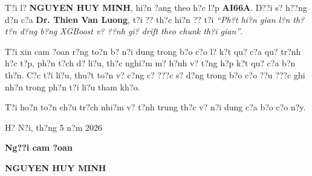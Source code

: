 T?i l? \textbf{NGUYEN HUY MINH}, hi?n ?ang theo h?c l?p \textbf{AI66A}. D??i s? h??ng d?n c?a \textbf{Dr. Thien Van Luong}, t?i ?? th?c hi?n ?? t?i \textit{``Ph?t hi?n gian l?n th? t?n d?ng b?ng XGBoost v? ??nh gi? drift theo chunk th?i gian''}.

T?i xin cam ?oan r?ng to?n b? n?i dung trong b?o c?o l? k?t qu? c?a qu? tr?nh h?c t?p, ph?n t?ch d? li?u, th?c nghi?m m? h?nh v? t?ng h?p k?t qu? c?a b?n th?n. C?c t?i li?u, thu?t to?n v? c?ng c? ???c s? d?ng trong b?o c?o ??u ???c ghi nh?n trong ph?n t?i li?u tham kh?o.

T?i ho?n to?n ch?u tr?ch nhi?m v? t?nh trung th?c v? n?i dung c?a b?o c?o n?y.

\vspace{6pt}
\hspace{8.3cm}H? N?i, th?ng 5 n?m 2026

\hspace{9cm}\textbf{Ng??i cam ?oan}

\vspace{2cm}
\hspace{8.35cm}\textbf{NGUYEN HUY MINH}
